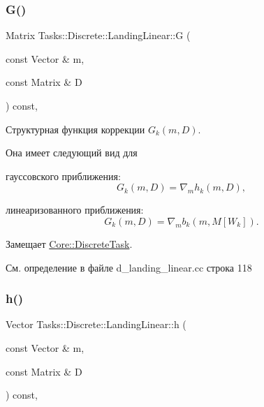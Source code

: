 \hypertarget{class_tasks_1_1_discrete_1_1_landing_linear_a290890c1d3a91803249a1f5d62bc658f}{}\label{class_tasks_1_1_discrete_1_1_landing_linear_a290890c1d3a91803249a1f5d62bc658f} 
\subsubsection{\texorpdfstring{G()}{G()}}
{\footnotesize\ttfamily Matrix Tasks\+::\+Discrete\+::\+Landing\+Linear\+::G (\begin{DoxyParamCaption}\item[{const Vector \&}]{m,  }\item[{const Matrix \&}]{D }\end{DoxyParamCaption}) const\hspace{0.3cm}{\ttfamily [override]}, {\ttfamily [virtual]}}



Структурная функция коррекции $G_k(m, D)$. 

Она имеет следующий вид для


\begin{DoxyItemize}
\item гауссовского приближения\+: \[G_k(m, D) = \nabla_m h_k(m,D),\]
\item линеаризованного приближения\+: \[G_k(m, D) = \nabla_m b_k(m, M[W_k]).\] 
\end{DoxyItemize}

Замещает \hyperlink{class_core_1_1_discrete_task_a5fd0bac544a6e124ad071043a37881c3}{Core\+::\+Discrete\+Task}.



См. определение в файле d\+\_\+landing\+\_\+linear.\+cc строка 118

\hypertarget{class_tasks_1_1_discrete_1_1_landing_linear_a9b1f90547fca3b460b48693b2e16219a}{}\label{class_tasks_1_1_discrete_1_1_landing_linear_a9b1f90547fca3b460b48693b2e16219a} 
\subsubsection{\texorpdfstring{h()}{h()}}
{\footnotesize\ttfamily Vector Tasks\+::\+Discrete\+::\+Landing\+Linear\+::h (\begin{DoxyParamCaption}\item[{const Vector \&}]{m,  }\item[{const Matrix \&}]{D }\end{DoxyParamCaption}) const\hspace{0.3cm}{\ttfamily [override]}, {\ttfamily [virtual]}}



